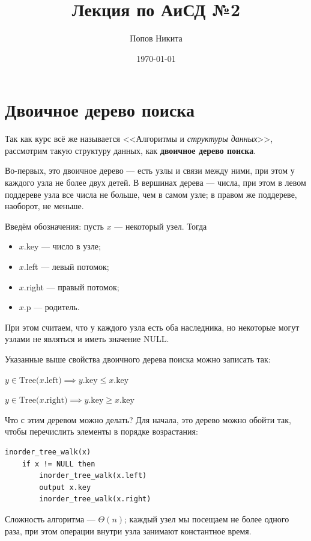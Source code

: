 \documentclass[11pt,a4paper]{article}
\title{Лекция по АиСД №2}
\date{\today}
\author{Попов Никита}
\begin{document}
\maketitle

\section*{Двоичное дерево поиска}

Так как курс всё же называется <<Алгоритмы и \emph{структуры данных}>>, рассмотрим такую структуру данных, как \textbf{двоичное дерево поиска}.

Во-первых, это двоичное дерево --- есть узлы и связи между ними, при этом у каждого узла не более двух детей.
В вершинах дерева --- числа, при этом в левом поддереве узла все числа не больше, чем в самом узле; в правом же поддереве, наоборот, не меньше.

Введём обозначения: пусть $x$ --- некоторый узел. Тогда
\begin{itemize}
    \item $x$.key --- число в узле;
    \item $x$.left --- левый потомок;
    \item $x$.right --- правый потомок;
    \item $x$.p --- родитель.
\end{itemize}

При этом считаем, что у каждого узла есть оба наследника, но некоторые могут узлами не являться и иметь значение NULL.

Указанные выше свойства двоичного дерева поиска можно записать так:

$y\in \text{Tree($x$.left)} \implies \text{$y$.key} \leqslant \text{$x$.key}$

$y\in \text{Tree($x$.right)} \implies \text{$y$.key} \geqslant \text{$x$.key}$

\vspace{0.6cm}

Что с этим деревом можно делать? Для начала, это дерево можно обойти так, чтобы перечислить элементы в порядке возрастания:

\begin{lstlisting}
inorder_tree_walk(x)
    if x != NULL then
        inorder_tree_walk(x.left)
        output x.key
        inorder_tree_walk(x.right)
\end{lstlisting}

Сложность алгоритма --- $\Theta(n)$; каждый узел мы посещаем не более одного раза, при этом операции внутри узла занимают константное время.
\end{document}
